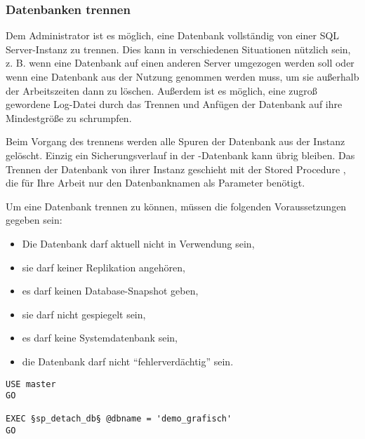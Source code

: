        \subsubsection{Datenbanken trennen}
          Dem Administrator ist es möglich, eine Datenbank vollständig von einer
          SQL Server-Instanz zu trennen. Dies kann in verschiedenen Situationen
          nützlich sein, z. B. wenn eine Datenbank auf einen anderen Server
          umgezogen werden soll oder wenn eine Datenbank aus der Nutzung genommen
          werden muss, um sie außerhalb der Arbeitszeiten dann zu löschen.
          Außerdem ist es möglich, eine zugroß gewordene Log-Datei durch das
          Trennen und Anfügen der Datenbank auf ihre Mindestgröße zu schrumpfen.
          
          Beim Vorgang des trennens werden alle Spuren der Datenbank aus der
          Instanz gelöscht. Einzig ein Sicherungsverlauf in der
          -Datenbank kann übrig bleiben. Das Trennen der
          Datenbank von ihrer Instanz geschieht mit der Stored Procedure
          , die f\"ur Ihre Arbeit nur den Datenbanknamen
          als Parameter benötigt.
          
          Um eine Datenbank trennen zu können, müssen die folgenden
          Voraussetzungen gegeben sein:
          \begin{itemize}
            \item Die Datenbank darf aktuell nicht in Verwendung sein,
            \item sie darf keiner Replikation angehören,
            \item es darf keinen Database-Snapshot geben,
            \item sie darf nicht gespiegelt sein,
            \item es darf keine Systemdatenbank sein,
            \item die Datenbank darf nicht \enquote{fehlerverdächtig} sein.
          \end{itemize}
          \begin{lstlisting}[language=ms_sql,caption={Trennen der Datenbank
          demo\_grafisch},label=admin03_20]
USE master
GO

EXEC §sp_detach_db§ @dbname = 'demo_grafisch'
GO
          \end{lstlisting}
          \begin{literaturinternet}
            \item \cite{ms188031}
          \end{literaturinternet}
